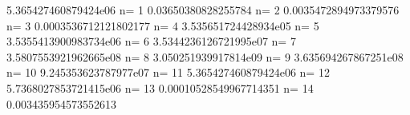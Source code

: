 \documentclass[letterpaper,10pt,english]{sphinxhowto}
\begin{document}
\begin{sphinxVerbatim}[commandchars=\\\{\}]
     

  
  

        

    
      
            
      

\end{sphinxVerbatim}

\begin{sphinxVerbatim}[commandchars=\\\{\}]
5.365427460879424e\PYGZhy{}06
n= 1 \PYGZhy{}0.03650380828255784
n= 2 \PYGZhy{}0.0035472894973379576
n= 3 \PYGZhy{}0.0003536712121802177
n= 4 \PYGZhy{}3.535651724428934e\PYGZhy{}05
n= 5 \PYGZhy{}3.5355413900983734e\PYGZhy{}06
n= 6 \PYGZhy{}3.5344236126721995e\PYGZhy{}07
n= 7 \PYGZhy{}3.5807553921962665e\PYGZhy{}08
n= 8 3.050251939917814e\PYGZhy{}09
n= 9 3.635694267867251e\PYGZhy{}08
n= 10 9.245353623787977e\PYGZhy{}07
n= 11 5.365427460879424e\PYGZhy{}06
n= 12 \PYGZhy{}5.7368027853721415e\PYGZhy{}06
n= 13 0.00010528549967714351
n= 14 0.003435954573552613
\end{sphinxVerbatim}
\end{document}
